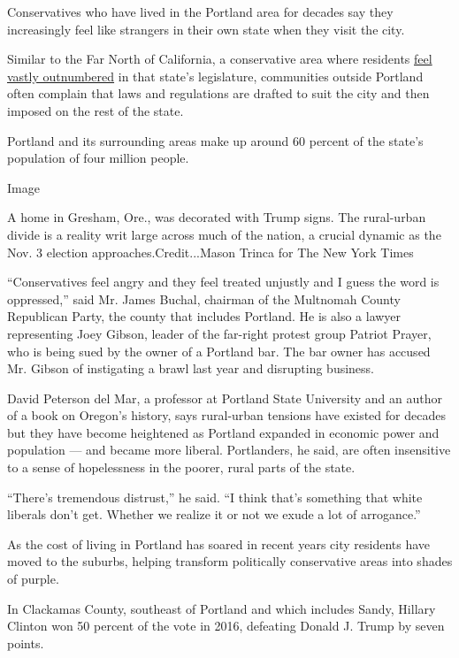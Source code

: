 Conservatives who have lived in the Portland area for decades say they
increasingly feel like strangers in their own state when they visit the
city.

Similar to the Far North of California, a conservative area where
residents
\href{https://www.nytimes3xbfgragh.onion/2017/07/02/us/california-far-north-identity-conservative.html}{feel
vastly outnumbered} in that state's legislature, communities outside
Portland often complain that laws and regulations are drafted to suit
the city and then imposed on the rest of the state.

Portland and its surrounding areas make up around 60 percent of the
state's population of four million people.

Image

A home in Gresham, Ore., was decorated with Trump signs. The rural-urban
divide is a reality writ large across much of the nation, a crucial
dynamic as the Nov. 3 election approaches.Credit...Mason Trinca for The
New York Times

``Conservatives feel angry and they feel treated unjustly and I guess
the word is oppressed,'' said Mr. James Buchal, chairman of the
Multnomah County Republican Party, the county that includes Portland. He
is also a lawyer representing Joey Gibson, leader of the far-right
protest group Patriot Prayer, who is being sued by the owner of a
Portland bar. The bar owner has accused Mr. Gibson of instigating a
brawl last year and disrupting business.

David Peterson del Mar, a professor at Portland State University and an
author of a book on Oregon's history, says rural-urban tensions have
existed for decades but they have become heightened as Portland expanded
in economic power and population --- and became more liberal.
Portlanders, he said, are often insensitive to a sense of hopelessness
in the poorer, rural parts of the state.

``There's tremendous distrust,'' he said. ``I think that's something
that white liberals don't get. Whether we realize it or not we exude a
lot of arrogance.''

As the cost of living in Portland has soared in recent years city
residents have moved to the suburbs, helping transform politically
conservative areas into shades of purple.

In Clackamas County, southeast of Portland and which includes Sandy,
Hillary Clinton won 50 percent of the vote in 2016, defeating Donald J.
Trump by seven points.


